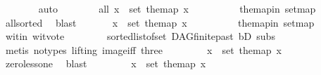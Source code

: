 \begin{isabellebody}
\ \ \ \ \ \ \isamarkupfalse%
\ auto\ \ \isanewline
\ \ \ \ \isamarkupfalse%
\ all{}{}{\isacharunderscore}{\kern0pt}{}{\isacharcolon}{\kern0pt}\ {\isachardoublequoteopen}{\isasymforall}x\ {\isasymin}\ set\ the{\isacharunderscore}{\kern0pt}map{\isachardot}{\kern0pt}\ x\ {\isasymin}\ {\isacharbraceleft}{\kern0pt}{}{\isacharcomma}{\kern0pt}{}{\isacharbraceright}{\kern0pt}{\isachardoublequoteclose}\isanewline
\ \ \ \ \ \ \isamarkupfalse%
\ the{\isacharunderscore}{\kern0pt}map{\isacharunderscore}{\kern0pt}in\ set{\isacharunderscore}{\kern0pt}map\ \isanewline
\ \ \ \ \ \ \isamarkupfalse%
\ allsorted{}{}\ \isamarkupfalse%
\ blast\ \isanewline
\ \ \ \ \isamarkupfalse%
\ {\isachardoublequoteopen}{\isasymexists}x\ {\isasymin}\ set\ the{\isacharunderscore}{\kern0pt}map{\isachardot}{\kern0pt}\ x\ {\isacharequal}{\kern0pt}\ {}{\isachardoublequoteclose}\isanewline
\ \ \ \ \ \ \isamarkupfalse%
\ the{\isacharunderscore}{\kern0pt}map{\isacharunderscore}{\kern0pt}in\ set{\isacharunderscore}{\kern0pt}map\ \isanewline
\ \ \ \ \ \ \isamarkupfalse%
\ wit{\isacharunderscore}{\kern0pt}in\ wit{\isacharunderscore}{\kern0pt}vote{}\isanewline
\ \ \ \ \ \ \ \ sorted{\isacharunderscore}{\kern0pt}list{\isacharunderscore}{\kern0pt}of{\isacharunderscore}{\kern0pt}set{\isacharparenleft}{\kern0pt}{}{\isacharparenright}{\kern0pt}\ DAG{\isachardot}{\kern0pt}finite{\isacharunderscore}{\kern0pt}past\ bD\ subs{\isacharparenleft}{\kern0pt}{}{\isacharparenright}{\kern0pt}\isanewline
\ \ \ \ \ \ \isamarkupfalse%
\ {\isacharparenleft}{\kern0pt}metis\ {\isacharparenleft}{\kern0pt}no{\isacharunderscore}{\kern0pt}types{\isacharcomma}{\kern0pt}\ lifting{\isacharparenright}{\kern0pt}\ image{\isacharunderscore}{\kern0pt}iff\ three{\isacharparenright}{\kern0pt}\ \isanewline
\ \ \ \ \isamarkupfalse%
\ \isamarkupfalse%
\ {\isachardoublequoteopen}{\isasymexists}x\ {\isasymin}\ set\ the{\isacharunderscore}{\kern0pt}map{\isachardot}{\kern0pt}\ x\ {\isachargreater}{\kern0pt}\ {}{\isachardoublequoteclose}\isanewline
\ \ \ \ \ \ \isamarkupfalse%
\ zero{\isacharunderscore}{\kern0pt}less{\isacharunderscore}{\kern0pt}one\ \isamarkupfalse%
\ blast\ \isanewline
\ \ \ \ \isamarkupfalse%
\ \isamarkupfalse%
\ {\isachardoublequoteopen}{\isasymforall}x\ {\isasymin}\ set\ the{\isacharunderscore}{\kern0pt}map{\isachardot}{\kern0pt}\ x\ {\isasymge}\ {}{\isachardoublequoteclose}\ \isamarkupfalse%

\end{isabellebody}
